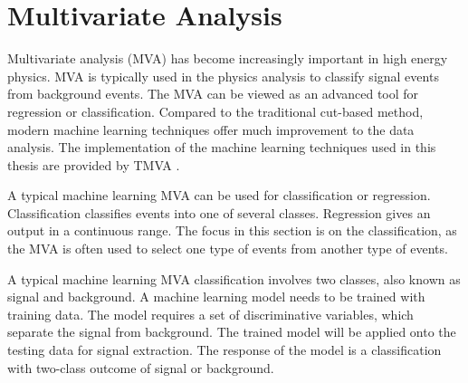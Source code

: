 \section{Multivariate Analysis}
\label{sec:pandoraMVA}

Multivariate analysis (MVA) has become increasingly important in high energy physics. MVA is typically used in the physics analysis to classify signal events from background events. The MVA can be viewed as an advanced tool for regression or classification. Compared to the traditional cut-based method, modern machine learning techniques offer much improvement to the data analysis. The implementation of the machine learning techniques used in this thesis are provided by  TMVA \cite{Hocker:2007ht}.

A typical machine learning MVA can be used for classification or regression. Classification classifies events into one of several classes. Regression gives an output in a continuous range. The focus in this section is on the classification, as the MVA is often used to select one type of events from another type of events.

A typical machine learning MVA classification involves two classes, also known as signal and background. A machine learning model needs to be trained with training data. The model requires a set of discriminative variables, which separate the signal from background. The trained model will be applied onto the testing data for signal extraction. The response of the model is a classification with two-class outcome of  signal or background.

